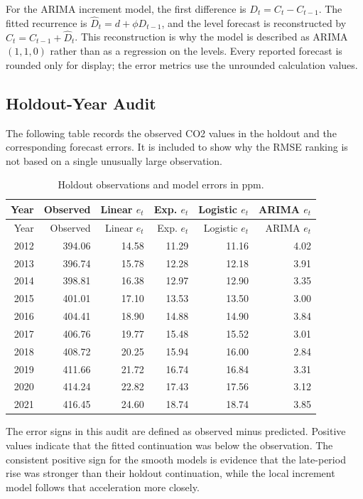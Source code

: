 \documentclass{mcmthesis}
\begin{document}
\begin{appendices}
For the ARIMA increment model, the first difference is $D_t=C_t-C_{t-1}$. The fitted recurrence is $\widehat D_t=d+\phi D_{t-1}$, and the level forecast is reconstructed by $\widehat C_t=C_{t-1}+\widehat D_t$. This reconstruction is why the model is described as ARIMA$(1,1,0)$ rather than as a regression on the levels. Every reported forecast is rounded only for display; the error metrics use the unrounded calculation values.

\subsection{Holdout-Year Audit}
The following table records the observed CO2 values in the holdout and the corresponding forecast errors. It is included to show why the RMSE ranking is not based on a single unusually large observation.
\begin{longtable}{r r r r r r}
\caption{Holdout observations and model errors in ppm.}\label{tab:holdout-audit}\\
\toprule Year & Observed & Linear $e_t$ & Exp. $e_t$ & Logistic $e_t$ & ARIMA $e_t$ \\
\midrule
\endfirsthead
\toprule Year & Observed & Linear $e_t$ & Exp. $e_t$ & Logistic $e_t$ & ARIMA $e_t$ \\
\midrule
\endhead
2012 & 394.06 & 14.58 & 11.29 & 11.16 & 4.02 \\
2013 & 396.74 & 15.78 & 12.28 & 12.18 & 3.91 \\
2014 & 398.81 & 16.38 & 12.97 & 12.90 & 3.35 \\
2015 & 401.01 & 17.10 & 13.53 & 13.50 & 3.00 \\
2016 & 404.41 & 18.90 & 14.88 & 14.90 & 3.84 \\
2017 & 406.76 & 19.77 & 15.48 & 15.52 & 3.01 \\
2018 & 408.72 & 20.25 & 15.94 & 16.00 & 2.84 \\
2019 & 411.66 & 21.72 & 16.74 & 16.84 & 3.31 \\
2020 & 414.24 & 22.82 & 17.43 & 17.56 & 3.12 \\
2021 & 416.45 & 24.60 & 18.74 & 18.74 & 3.85 \\
\bottomrule
\end{longtable}
The error signs in this audit are defined as observed minus predicted. Positive values indicate that the fitted continuation was below the observation. The consistent positive sign for the smooth models is evidence that the late-period rise was stronger than their holdout continuation, while the local increment model follows that acceleration more closely.


\end{appendices}
\end{document}
